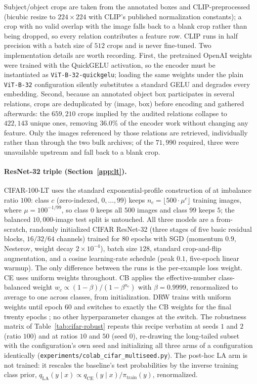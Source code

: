 \documentclass[preprint,times,10pt,a4paper]{elsarticle}
\theoremstyle{plain}
\theoremstyle{definition}
\begin{document}
Subject/object crops are taken from the annotated boxes and CLIP-preprocessed (bicubic
resize to $224\times224$ with CLIP's published normalization constants); a crop with no
valid overlap with the image falls back to a blank crop rather than being dropped, so
every relation contributes a feature row. CLIP runs in half precision with a batch size
of $512$ crops and is never fine-tuned. Two implementation details are worth recording.
First, the pretrained OpenAI weights were trained with the QuickGELU activation, so the
encoder must be instantiated as \texttt{ViT-B-32-quickgelu}; loading the same weights
under the plain \texttt{ViT-B-32} configuration silently substitutes a standard GELU and
degrades every embedding. Second, because an annotated object box participates in
several relations, crops are deduplicated by (image, box) before encoding and gathered
afterwards: the $659{,}210$ crops implied by the audited relations collapse to
$422{,}143$ unique ones, removing $36.0\%$ of the encoder work without changing any
feature. Only the images referenced by those relations are retrieved, individually rather
than through the two bulk archives; of the $71{,}990$ required, three were unavailable
upstream and fall back to a blank crop.

\paragraph{ResNet-32 triple (Section~\ref{app:lt}).} CIFAR-100-LT uses the standard
exponential-profile construction of \citet{cui2019classbalanced} at imbalance ratio
$100$: class $c$ (zero-indexed, $0,\ldots,99$) keeps
$n_c=\lfloor 500\cdot\mu^{c}\rfloor$ training images, where
$\mu=100^{-1/99}$, so class $0$ keeps all $500$ images and class $99$ keeps $5$; the
balanced $10{,}000$-image test split is untouched. All three models are a from-scratch,
randomly initialized CIFAR ResNet-32 (three stages of five basic residual blocks,
$16/32/64$ channels) trained for $80$ epochs with SGD (momentum $0.9$, Nesterov,
weight decay $2\times10^{-4}$), batch size $128$, standard crop-and-flip augmentation,
and a cosine learning-rate schedule (peak $0.1$, five-epoch linear warmup). The only
difference between the runs is the per-example loss weight. CE uses uniform weights
throughout. CB applies the effective-number class-balanced weight
$w_c\propto(1-\beta)/(1-\beta^{n_c})$ with $\beta=0.9999$, renormalized to average to
one across classes, from initialization. DRW trains with uniform weights until epoch
$60$ and switches to exactly the CB weights for the final twenty epochs
\citep{cao2019learning}; no other hyperparameter changes at the switch. The robustness
matrix of Table~\ref{tab:cifar-robust} repeats this recipe verbatim at seeds $1$ and $2$
(ratio $100$) and at ratios $10$ and $50$ (seed $0$), re-drawing the long-tailed subset
with the configuration's own seed and initializing all three arms of a configuration
identically (\texttt{experiments/colab\_cifar\_multiseed.py}). The post-hoc LA arm is not
trained: it rescales the baseline's test probabilities by the inverse training class
prior, $q_{\mathrm{LA}}(y\mid x)\propto q_{\mathrm{CE}}(y\mid x)/\pi_{\mathrm{train}}(y)$,
renormalized.
\end{document}
